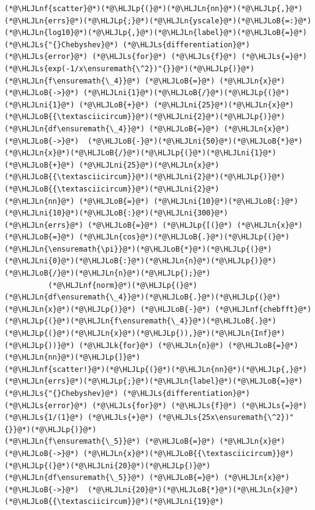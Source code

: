 \documentclass[12pt,a4paper]{article}
\newcommand{\HLJLk}[1]{\textcolor[RGB]{148,91,176}{\textbf{#1}}}
\newcommand{\HLJLn}[1]{#1}
\newcommand{\HLJLnf}[1]{\textcolor[RGB]{66,102,213}{#1}}
\newcommand{\HLJLs}[1]{\textcolor[RGB]{201,61,57}{#1}}
\newcommand{\HLJLni}[1]{\textcolor[RGB]{59,151,46}{#1}}
\newcommand{\HLJLoB}[1]{\textcolor[RGB]{102,102,102}{\textbf{#1}}}
\newcommand{\HLJLp}[1]{#1}
\begin{document}
\begin{lstlisting}
(*@\HLJLnf{scatter}@*)(*@\HLJLp{(}@*)(*@\HLJLn{nn}@*)(*@\HLJLp{,}@*)(*@\HLJLn{errs}@*)(*@\HLJLp{;}@*)(*@\HLJLn{yscale}@*)(*@\HLJLoB{=:}@*)(*@\HLJLn{log10}@*)(*@\HLJLp{,}@*)(*@\HLJLn{label}@*)(*@\HLJLoB{=}@*)(*@\HLJLs{"{}Chebyshev}@*) (*@\HLJLs{differentiation}@*) (*@\HLJLs{error}@*) (*@\HLJLs{for}@*) (*@\HLJLs{f}@*) (*@\HLJLs{=}@*) (*@\HLJLs{exp(-1/x\ensuremath{\^2})"{}}@*)(*@\HLJLp{)}@*)
(*@\HLJLn{f\ensuremath{\_4}}@*) (*@\HLJLoB{=}@*) (*@\HLJLn{x}@*) (*@\HLJLoB{->}@*) (*@\HLJLni{1}@*)(*@\HLJLoB{/}@*)(*@\HLJLp{(}@*)(*@\HLJLni{1}@*) (*@\HLJLoB{+}@*) (*@\HLJLni{25}@*)(*@\HLJLn{x}@*)(*@\HLJLoB{{\textasciicircum}}@*)(*@\HLJLni{2}@*)(*@\HLJLp{)}@*)
(*@\HLJLn{df\ensuremath{\_4}}@*) (*@\HLJLoB{=}@*) (*@\HLJLn{x}@*) (*@\HLJLoB{->}@*)  (*@\HLJLoB{-}@*)(*@\HLJLni{50}@*)(*@\HLJLoB{*}@*)(*@\HLJLn{x}@*)(*@\HLJLoB{/}@*)(*@\HLJLp{(}@*)(*@\HLJLni{1}@*) (*@\HLJLoB{+}@*) (*@\HLJLni{25}@*)(*@\HLJLn{x}@*)(*@\HLJLoB{{\textasciicircum}}@*)(*@\HLJLni{2}@*)(*@\HLJLp{)}@*)(*@\HLJLoB{{\textasciicircum}}@*)(*@\HLJLni{2}@*)
(*@\HLJLn{nn}@*) (*@\HLJLoB{=}@*) (*@\HLJLni{10}@*)(*@\HLJLoB{:}@*)(*@\HLJLni{10}@*)(*@\HLJLoB{:}@*)(*@\HLJLni{300}@*)
(*@\HLJLn{errs}@*) (*@\HLJLoB{=}@*) (*@\HLJLp{[(}@*) (*@\HLJLn{x}@*) (*@\HLJLoB{=}@*) (*@\HLJLn{cos}@*)(*@\HLJLoB{.}@*)(*@\HLJLp{(}@*)(*@\HLJLn{\ensuremath{\pi}}@*)(*@\HLJLoB{*}@*)(*@\HLJLp{(}@*)(*@\HLJLni{0}@*)(*@\HLJLoB{:}@*)(*@\HLJLn{n}@*)(*@\HLJLp{)}@*)(*@\HLJLoB{/}@*)(*@\HLJLn{n}@*)(*@\HLJLp{);}@*)
          (*@\HLJLnf{norm}@*)(*@\HLJLp{(}@*)(*@\HLJLn{df\ensuremath{\_4}}@*)(*@\HLJLoB{.}@*)(*@\HLJLp{(}@*)(*@\HLJLn{x}@*)(*@\HLJLp{)}@*) (*@\HLJLoB{-}@*) (*@\HLJLnf{chebfft}@*)(*@\HLJLp{(}@*)(*@\HLJLn{f\ensuremath{\_4}}@*)(*@\HLJLoB{.}@*)(*@\HLJLp{(}@*)(*@\HLJLn{x}@*)(*@\HLJLp{)),}@*)(*@\HLJLn{Inf}@*)(*@\HLJLp{))}@*) (*@\HLJLk{for}@*) (*@\HLJLn{n}@*) (*@\HLJLoB{=}@*) (*@\HLJLn{nn}@*)(*@\HLJLp{]}@*)
(*@\HLJLnf{scatter!}@*)(*@\HLJLp{(}@*)(*@\HLJLn{nn}@*)(*@\HLJLp{,}@*)(*@\HLJLn{errs}@*)(*@\HLJLp{;}@*)(*@\HLJLn{label}@*)(*@\HLJLoB{=}@*)(*@\HLJLs{"{}Chebyshev}@*) (*@\HLJLs{differentiation}@*) (*@\HLJLs{error}@*) (*@\HLJLs{for}@*) (*@\HLJLs{f}@*) (*@\HLJLs{=}@*) (*@\HLJLs{1/(1}@*) (*@\HLJLs{+}@*) (*@\HLJLs{25x\ensuremath{\^2})"{}}@*)(*@\HLJLp{)}@*)
(*@\HLJLn{f\ensuremath{\_5}}@*) (*@\HLJLoB{=}@*) (*@\HLJLn{x}@*) (*@\HLJLoB{->}@*) (*@\HLJLn{x}@*)(*@\HLJLoB{{\textasciicircum}}@*)(*@\HLJLp{(}@*)(*@\HLJLni{20}@*)(*@\HLJLp{)}@*)
(*@\HLJLn{df\ensuremath{\_5}}@*) (*@\HLJLoB{=}@*) (*@\HLJLn{x}@*) (*@\HLJLoB{->}@*)  (*@\HLJLni{20}@*)(*@\HLJLoB{*}@*)(*@\HLJLn{x}@*)(*@\HLJLoB{{\textasciicircum}}@*)(*@\HLJLni{19}@*)

\end{lstlisting}
\end{document}

